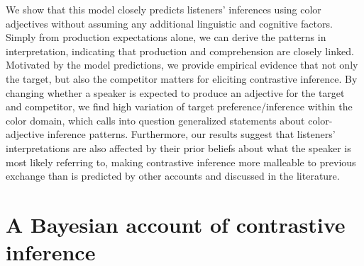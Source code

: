 \documentclass[a4paper,man,floatsintext,natbib]{apa6}
\newcommand{\ek}[1]{\textcolor{Orange}{[ek: #1]}}
\begin{document}

We show that this model closely predicts listeners' inferences using color adjectives without assuming any additional linguistic and cognitive factors. Simply from production expectations alone, we can derive the patterns in interpretation, indicating that production and comprehension are closely linked. Motivated by the model predictions, we provide empirical evidence that not only the target, but also the competitor matters for eliciting contrastive inference. By changing whether a speaker is expected to produce an adjective for the target and competitor, we find high variation of target preference/inference within the color domain, which calls into question generalized statements about color-adjective inference patterns. Furthermore, our results suggest that listeners' interpretations are also affected by their prior beliefs about what the speaker is most likely referring to, making contrastive inference more malleable to previous exchange than is predicted by other accounts and discussed in the literature.



\section{A Bayesian account of contrastive inference}
\end{document}
